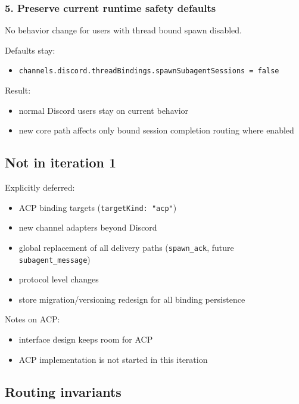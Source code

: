 \subsubsection{5. Preserve current runtime safety defaults}


No behavior change for users with thread bound spawn disabled.

Defaults stay:

\begin{itemize}
  \item \texttt{channels.discord.threadBindings.spawnSubagentSessions = false}
\end{itemize}


Result:

\begin{itemize}
  \item normal Discord users stay on current behavior
  \item new core path affects only bound session completion routing where enabled
\end{itemize}


\subsection{Not in iteration 1}


Explicitly deferred:

\begin{itemize}
  \item ACP binding targets (\texttt{targetKind: "acp"})
  \item new channel adapters beyond Discord
  \item global replacement of all delivery paths (\texttt{spawn\_ack}, future \texttt{subagent\_message})
  \item protocol level changes
  \item store migration/versioning redesign for all binding persistence
\end{itemize}


Notes on ACP:

\begin{itemize}
  \item interface design keeps room for ACP
  \item ACP implementation is not started in this iteration
\end{itemize}


\subsection{Routing invariants}


